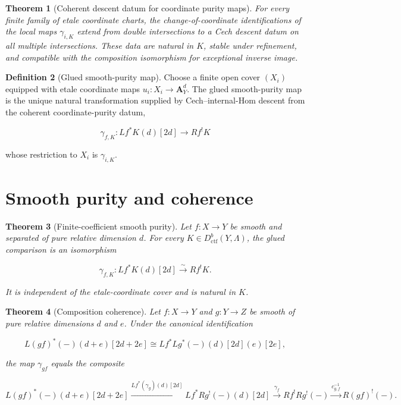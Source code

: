 \documentclass[10pt]{article}
\newtheorem{theorem}{Theorem}[section]
\theoremstyle{definition}
\newtheorem{definition}[theorem]{Definition}
\newcommand{\Dctf}{D^b_{\mathrm{ctf}}}
\begin{document}
\begin{theorem}[Coherent descent datum for coordinate purity maps]
For every finite family of etale coordinate charts, the change-of-coordinate
identifications of the local maps \(\gamma_{i,K}\) extend from double
intersections to a Cech descent datum on all multiple intersections.  These
data are natural in \(K\), stable under refinement, and compatible with the
composition isomorphism for exceptional inverse image.
\end{theorem}

\begin{definition}[Glued smooth-purity map]
Choose a finite open cover \((X_i)\) equipped with etale coordinate maps
\(u_i:X_i\to\mathbf A^d_Y\).  The glued smooth-purity map is the unique
natural transformation supplied by Cech--internal-Hom descent from the
coherent coordinate-purity datum,

\[
 \gamma_{f,K}:Lf^*K(d)[2d]\longrightarrow Rf^!K
\]

whose restriction to \(X_i\) is \(\gamma_{i,K}\).
\end{definition}

\section{Smooth purity and coherence}

\begin{theorem}[Finite-coefficient smooth purity]
Let \(f:X\to Y\) be smooth and separated of pure relative dimension \(d\).
For every \(K\in\Dctf(Y,\Lambda)\), the glued comparison is an isomorphism

\[
 \gamma_{f,K}:Lf^*K(d)[2d]\xrightarrow{\sim}Rf^!K.
\]

It is independent of the etale-coordinate cover and is natural in \(K\).
\end{theorem}

\begin{theorem}[Composition coherence]
Let \(f:X\to Y\) and \(g:Y\to Z\) be smooth of pure relative dimensions
\(d\) and \(e\).  Under the canonical identification

\[
 L(gf)^*(-)(d+e)[2d+2e]
 \cong Lf^*Lg^*(-)(d)[2d](e)[2e],
\]

the map \(\gamma_{gf}\) equals the composite

\[
 L(gf)^*(-)(d+e)[2d+2e]
 \xrightarrow{Lf^*(\gamma_g)(d)[2d]}
 Lf^*Rg^!(-)(d)[2d]
 \xrightarrow{\gamma_f}
 Rf^!Rg^!(-)
 \xrightarrow{c_{g,f}^{-1}}R(gf)^!(-).
\]
\end{theorem}
\end{document}
